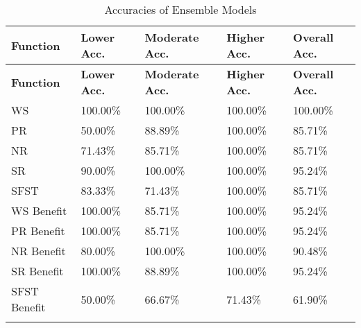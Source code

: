 \documentclass[12pt,letterpaper]{article}
\begin{document}
\begin{longtable}{|p{3cm}|p{2.5cm}|p{2.5cm}|p{2.5cm}|p{2.5cm}|}
\hline
\textbf{Function} & \textbf{Lower Acc.} & \textbf{Moderate Acc.} & \textbf{Higher Acc.} & \textbf{Overall Acc.} \\ \hline
\endfirsthead
\hline
\textbf{Function} & \textbf{Lower Acc.} & \textbf{Moderate Acc.} & \textbf{Higher Acc.} & \textbf{Overall Acc.} \\ \hline
\endhead

WS & 100.00\% & 100.00\% & 100.00\% & 100.00\% \\ \hline
PR & 50.00\% & 88.89\% & 100.00\% & 85.71\% \\ \hline
NR & 71.43\% & 85.71\% & 100.00\% & 85.71\% \\ \hline
SR & 90.00\% & 100.00\% & 100.00\% & 95.24\% \\ \hline
SFST & 83.33\% & 71.43\% & 100.00\% & 85.71\% \\ \hline

WS Benefit & 100.00\% & 85.71\% & 100.00\% & 95.24\% \\ \hline
PR Benefit & 100.00\% & 85.71\% & 100.00\% & 95.24\% \\ \hline
NR Benefit & 80.00\% & 100.00\% & 100.00\% & 90.48\% \\ \hline
SR Benefit & 100.00\% & 88.89\% & 100.00\% & 95.24\% \\ \hline
SFST Benefit & 50.00\% & 66.67\% & 71.43\% & 61.90\% \\ \hline

\caption{Accuracies of Ensemble Models}
\label{tab:grouping_2_reg_spec}
\end{longtable}
\end{document}
